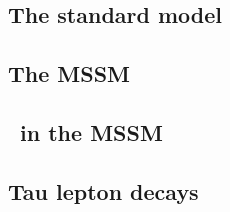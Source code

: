 \subsection*{The standard model}

\subsection*{The MSSM}

\subsection*{\HAtoTauTau\ in the MSSM}

\subsection*{Tau lepton decays}

